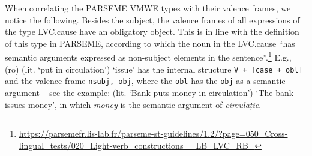 \documentclass[output=paper,colorlinks,citecolor=brown]{langscibook}
\begin{document}
When correlating the PARSEME VMWE types with their valence frames, we notice the following.  
Besides the subject, the valence frames of all expressions of the type LVC.cause have an obligatory object. This is in line with the definition of this type in PARSEME, according to which the noun in the LVC.cause ``has semantic arguments expressed as non-subject elements in the sentence''.\footnote{\url{https://parsemefr.lis-lab.fr/parseme-st-guidelines/1.2/?page=050_Cross-lingual_tests/020_Light-verb_constructions__LB_LVC_RB_}} E.g., (ro)  (lit. `put in circulation') {`issue'}
has the internal structure \texttt{V + [case + obl]} and the valence frame \texttt{nsubj, obj}, where the \texttt{obl} has the \texttt{obj} as a semantic argument -- see the example:  (lit. `Bank puts money in circulation') {`The bank issues money'}, 
in which \textit{money} is the semantic argument of \textit{circulație}.
\end{document}
